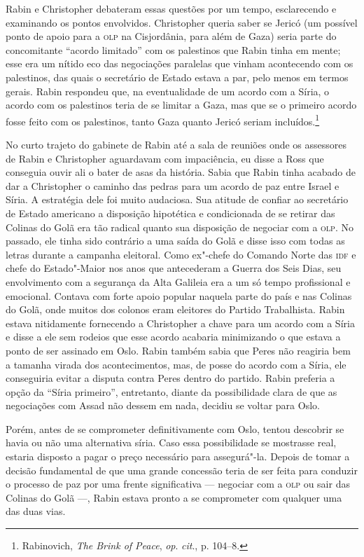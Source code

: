 Rabin e Christopher debateram essas questões por um tempo, esclarecendo
e examinando os pontos envolvidos. Christopher queria saber se Jericó
(um possível ponto de apoio para a \textsc{olp} na Cisjordânia, para além de
Gaza) seria parte do concomitante ``acordo limitado'' com os palestinos
que Rabin tinha em mente; esse era um nítido eco das negociações
paralelas que vinham acontecendo com os palestinos, das quais o
secretário de Estado estava a par, pelo menos em termos gerais. Rabin
respondeu que, na eventualidade de um acordo com a Síria, o acordo com os
palestinos teria de se limitar a Gaza, mas que se o primeiro acordo
fosse feito com os palestinos, tanto Gaza quanto Jericó seriam
incluídos.\footnote{Rabinovich, \emph{The Brink of Peace}, \emph{op}.
\emph{cit}., p. 104--8.}

No curto trajeto do gabinete de Rabin até a sala de reuniões onde os
assessores de Rabin e Christopher aguardavam com impaciência, eu disse a
Ross que conseguia ouvir ali o bater de asas da história. Sabia que
Rabin tinha acabado de dar a Christopher o caminho das pedras para um
acordo de paz entre Israel e Síria. A estratégia dele foi muito
audaciosa. Sua atitude de confiar ao secretário de Estado americano a
disposição hipotética e condicionada de se retirar das Colinas do Golã
era tão radical quanto sua disposição de negociar com a \textsc{olp}. No passado,
ele tinha sido contrário a uma saída do Golã e disse isso com todas as
letras durante a campanha eleitoral. Como ex"-chefe do Comando Norte
das \textsc{idf} e chefe do Estado"-Maior nos anos que antecederam a Guerra dos
Seis Dias, seu envolvimento com a segurança da Alta Galileia era a um só
tempo profissional e emocional. Contava com forte apoio popular naquela
parte do país e nas Colinas do Golã, onde muitos dos colonos eram
eleitores do Partido Trabalhista. Rabin estava nitidamente fornecendo a
Christopher a chave para um acordo com a Síria e disse a ele sem rodeios
que esse acordo acabaria minimizando o que estava a ponto de ser
assinado em Oslo. Rabin também sabia que Peres não reagiria bem a
tamanha virada dos acontecimentos, mas, de posse do acordo com a Síria,
ele conseguiria evitar a disputa contra Peres dentro do partido. Rabin
preferia a opção da ``Síria primeiro'', entretanto, diante da possibilidade
clara de que as negociações com Assad não dessem em nada, decidiu se
voltar para Oslo.

Porém, antes de se comprometer definitivamente com Oslo, tentou
descobrir se havia ou não uma alternativa síria. Caso essa possibilidade
se mostrasse real, estaria disposto a pagar o preço necessário para
assegurá"-la. Depois de tomar a decisão fundamental de que uma grande
concessão teria de ser feita para conduzir o processo de paz por uma
frente significativa --- negociar com a \textsc{olp} ou sair das Colinas do Golã
---, Rabin estava pronto a se comprometer com qualquer uma das duas vias.

